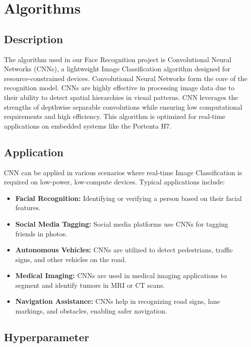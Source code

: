 \chapter{Algorithms}
\section{Description}

The algorithm used in our Face Recognition project is Convolutional Neural Networks (CNNs), a lightweight Image Classification algorithm designed for resource-constrained devices. Convolutional Neural Networks form the core of the recognition model. CNNs are highly effective in processing image data due to their ability to detect spatial hierarchies in visual patterns. CNN leverages the strengths of depthwise separable convolutions while ensuring low computational requirements and high efficiency. This algorithm is optimized for real-time applications on embedded systems like the Portenta H7. \cite{vascellari2024}

\section{Application}

CNN can be applied in various scenarios where real-time Image Classification is required on low-power, low-compute devices. Typical applications include:

\begin{itemize}
	\item \textbf{Facial Recognition:} Identifying or verifying a person based on their facial features. \cite{restack2024}
	\item \textbf{Social Media Tagging:} Social media platforms use CNNs for tagging friends in photos. \cite{celerdata2024}
	\item \textbf{Autonomous Vehicles:} CNNs are utilized to detect pedestrians, traffic signs, and other vehicles on the road. \cite{alliancetek2024}
	\item \textbf{Medical Imaging:} CNNs are used in medical imaging applications to segment and identify tumors in MRI or CT scans. \cite{techtarget2024}
	\item \textbf{Navigation Assistance:} CNNs help in recognizing road signs, lane markings, and obstacles, enabling safer navigation. \cite{alliancetek2024}
\end{itemize}

\section{Hyperparameter}


